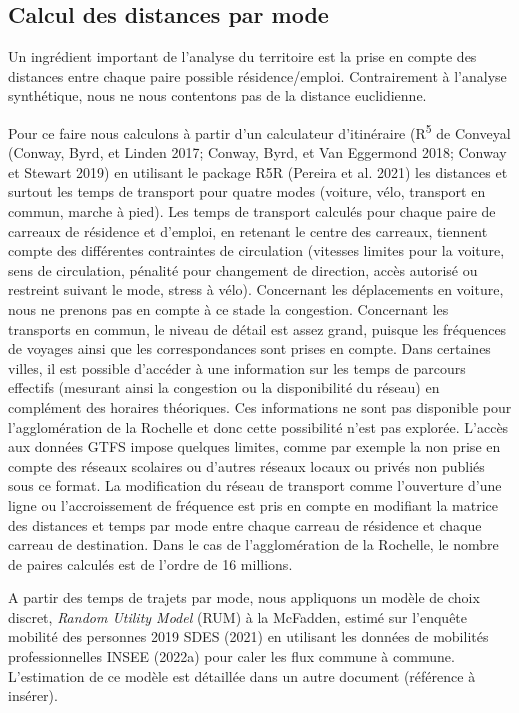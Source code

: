 \documentclass[
  10pt,
  a4paper,
  numbers=noendperiod,
  DIV=9]{scrreprt}
\begin{document}
\hypertarget{calcul-des-distances-par-mode}{%
\subsection{Calcul des distances par
mode}\label{calcul-des-distances-par-mode}}

Un ingrédient important de l'analyse du territoire est la prise en
compte des distances entre chaque paire possible résidence/emploi.
Contrairement à l'analyse synthétique, nous ne nous contentons pas de la
distance euclidienne.

Pour ce faire nous calculons à partir d'un calculateur d'itinéraire
(R\textsuperscript{5} de Conveyal (Conway, Byrd, et Linden 2017; Conway,
Byrd, et Van Eggermond 2018; Conway et Stewart 2019) en utilisant le
package R5R (Pereira et al. 2021) les distances et surtout les temps de
transport pour quatre modes (voiture, vélo, transport en commun, marche
à pied). Les temps de transport calculés pour chaque paire de carreaux
de résidence et d'emploi, en retenant le centre des carreaux, tiennent
compte des différentes contraintes de circulation (vitesses limites pour
la voiture, sens de circulation, pénalité pour changement de direction,
accès autorisé ou restreint suivant le mode, stress à vélo). Concernant
les déplacements en voiture, nous ne prenons pas en compte à ce stade la
congestion. Concernant les transports en commun, le niveau de détail est
assez grand, puisque les fréquences de voyages ainsi que les
correspondances sont prises en compte. Dans certaines villes, il est
possible d'accéder à une information sur les temps de parcours effectifs
(mesurant ainsi la congestion ou la disponibilité du réseau) en
complément des horaires théoriques. Ces informations ne sont pas
disponible pour l'agglomération de la Rochelle et donc cette possibilité
n'est pas explorée. L'accès aux données GTFS impose quelques limites,
comme par exemple la non prise en compte des réseaux scolaires ou
d'autres réseaux locaux ou privés non publiés sous ce format. La
modification du réseau de transport comme l'ouverture d'une ligne ou
l'accroissement de fréquence est pris en compte en modifiant la matrice
des distances et temps par mode entre chaque carreau de résidence et
chaque carreau de destination. Dans le cas de l'agglomération de la
Rochelle, le nombre de paires calculés est de l'ordre de 16 millions.

A partir des temps de trajets par mode, nous appliquons un modèle de
choix discret, \emph{Random Utility Model} (RUM) à la McFadden, estimé
sur l'enquête mobilité des personnes 2019 SDES (2021) en utilisant les
données de mobilités professionnelles INSEE (2022a) pour caler les flux
commune à commune. L'estimation de ce modèle est détaillée dans un autre
document (référence à insérer).
\end{document}
